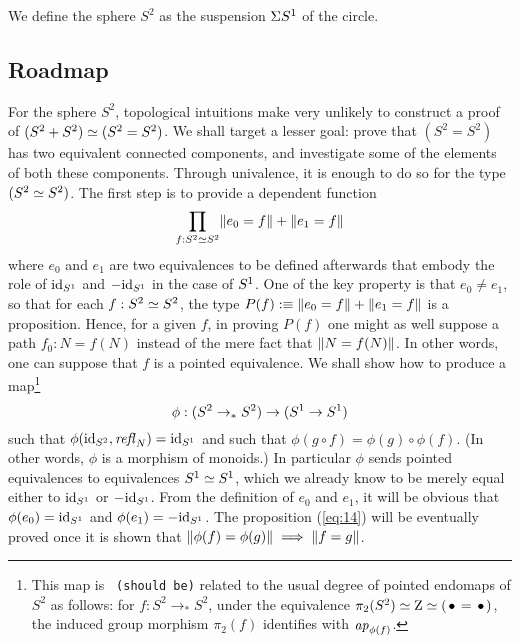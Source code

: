 \documentclass[english,a4]{article}
\newcommand{\Sp}{{S^2}}%
\newcommand{\susp}[1]{\Sigma{#1}}%
\newcommand{\Truncprop}[1]{\Trunc{#1}}%
\newcommand{\ptdto}{\to_\ast}%
\begin{document}
We define the sphere $\Sp$ as the suspension $\susp\Sc$ of the circle.

\subsection{Roadmap}
\label{sec:roadmap}

For the sphere $\Sp$, topological intuitions make very unlikely to
construct a proof of $(\Sp + \Sp) \weq (\Sp = \Sp)$. We shall target a
lesser goal: prove that $(\Sp = \Sp)$ has two equivalent connected
components, and investigate some of the elements of both these
components. Through univalence, it is enough to do so for the type
$(\Sp \weq \Sp)$. The first step is to provide a dependent function
\begin{equation}
  \label{eq:14}
  \prod_{f:\Sp \weq \Sp} \Truncprop{e_0=f} + \Truncprop{e_1=f}
\end{equation}
where $e_0$ and $e_1$ are two equivalences to be defined afterwards
that embody the role of $\mathord{\mathrm{id}}_{S^1}$ and $-\mathord{\mathrm{id}}_{S^1}$ in the case of
${S^1}$. One of the key property is that $e_0 \neq e_1$, so that for
each $f: \Sp \weq \Sp$, the type
$P(f) \defequi \Truncprop{e_0=f} + \Truncprop{e_1=f}$ is a
proposition. Hence, for a given $f$, in proving $P(f)$ one might as
well suppose a path $f_0: N = f(N)$ instead of the mere fact that
$\Truncprop{N=f(N)}$. In other words, one can suppose that $f$ is a
pointed equivalence. We shall show how to produce a map\footnote{This
  map is {\tt \color{red} (should be)} related to the usual degree of
  pointed endomaps of $\Sp$ as follows: for $f:\Sp \ptdto \Sp$, under
  the equivalence $\pi_2(\Sp) \weq \zet \weq (\base = \base)$, the
  induced group morphism $\pi_2(f)$ identifies with $\mathop{{\it ap}_{\phi(f)}}$.}
\begin{equation}
  \label{eq:18}
  \phi: (\Sp \ptdto \Sp) \to (\Sc \to \Sc)
\end{equation}
such that $\phi(\id_{\Sp},\refl N) = \id_\Sc$ and such that
$\phi(g\circ f) = \phi(g) \circ \phi(f)$. (In other words, $\phi$ is a
morphism of monoids.) In particular $\phi$ sends pointed equivalences
to equivalences ${S^1} \simeq {S^1}$, which we already know to be merely
equal either to $\mathord{\mathrm{id}}_{S^1}$ or $-\mathord{\mathrm{id}}_{S^1}$. From the definition of $e_0$
and $e_1$, it will be obvious that $\phi(e_0) = \mathord{\mathrm{id}}_{S^1}$ and
$\phi(e_1) = -\mathord{\mathrm{id}}_{S^1}$. The proposition (\ref{eq:14}) will be
eventually proved once it is shown that
$\Truncprop{\phi(f) = \phi(g)} \implies \Truncprop{f=g}$.
\end{document}
